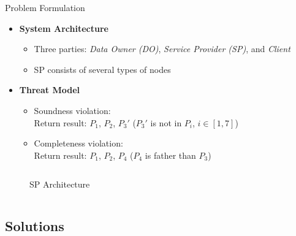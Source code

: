 \documentclass[xcolor={dvipsnames},aspectratio=169,10pt]{beamer}
\begin{document}
\begin{frame}{Problem Formulation}
  \begin{itemize}[<+->]
    \item \textbf{System Architecture}
      \begin{itemize}[<1->]
        \item Three parties: \emph{Data Owner (DO)}, \emph{Service Provider (SP)}, and \emph{Client}
        \item SP consists of several types of nodes
      \end{itemize}
    \item \textbf{Threat Model}
      \begin{itemize}[<1->]
        \item \alert{Soundness} violation: \\
          Return result: $P_1$, $P_2$, $P_3'$ ($P_3'$ is not in $P_i$, $i \in [1, 7]$)
        \item \alert{Completeness} violation: \\
          Return result: $P_1$, $P_2$, $P_4$ ($P_4$ is father than $P_3$)
      \end{itemize}
  \end{itemize}
  \begin{columns}[b,onlytextwidth]
    \begin{column}{0.5\linewidth}
      \begin{figure}
        \resizebox{\linewidth}{!}{}
        \caption{SP Architecture}
      \end{figure}
    \end{column}
    \begin{column}{0.5\linewidth}
      \begin{figure}
      \end{figure}
    \end{column}
  \end{columns}
\end{frame}

\subsection{Solutions}
\end{document}
